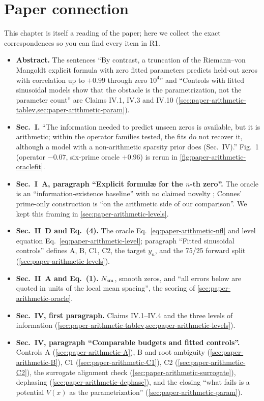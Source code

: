 \section{Paper connection}\label{sec:paper-arithmetic-paper}

This chapter is itself a reading of the paper; here we collect the exact correspondences so you can find every item in R1.

\begin{itemize}
\item \textbf{Abstract.} The sentences ``By contrast, a truncation of the Riemann--von Mangoldt explicit formula with zero fitted parameters predicts held-out zeros with correlation up to $+0.99$ through zero $10^4$'' and ``Controls with fitted sinusoidal models show that the obstacle is the parametrization, not the parameter count'' are Claims IV.1, IV.3 and IV.10 (\cref{sec:paper-arithmetic-tablev,sec:paper-arithmetic-param}).
\item \textbf{Sec.~I.} ``The information needed to predict unseen zeros is available, but it is arithmetic; within the operator families tested, the fits do not recover it, although a model with a non-arithmetic sparsity prior does (Sec.~IV).'' Fig.~1 (operator $-0.07$, six-prime oracle $+0.96$) is rerun in \cref{fig:paper-arithmetic-oraclefit}.
\item \textbf{Sec.~I~A, paragraph ``Explicit formul\ae{} for the $n$-th zero''.} The oracle is an ``information-existence baseline'' with no claimed novelty \cite{francaleclair,leclair}; Connes' prime-only construction \cite{connes26} is ``on the arithmetic side of our comparison''. We kept this framing in \cref{sec:paper-arithmetic-levels}.
\item \textbf{Sec.~II~D and Eq.~(4).} The oracle Eq.~\eqref{eq:paper-arithmetic-nfl} and level equation Eq.~\eqref{eq:paper-arithmetic-level}; paragraph ``Fitted sinusoidal controls'' defines A, B, C1, C2, the target $y_n$, and the 75/25 forward split (\cref{sec:paper-arithmetic-levels}).
\item \textbf{Sec.~II~A and Eq.~(1).} $N_{\mathrm{sm}}$, smooth zeros, and ``all errors below are quoted in units of the local mean spacing'', the scoring of \cref{sec:paper-arithmetic-oracle}.
\item \textbf{Sec.~IV, first paragraph.} Claims IV.1--IV.4 and the three levels of information (\cref{sec:paper-arithmetic-tablev,sec:paper-arithmetic-levels}).
\item \textbf{Sec.~IV, paragraph ``Comparable budgets and fitted controls''.} Controls A (\cref{sec:paper-arithmetic-A}), B and root ambiguity (\cref{sec:paper-arithmetic-B}), C1 (\cref{sec:paper-arithmetic-C1}), C2 (\cref{sec:paper-arithmetic-C2}), the surrogate alignment check (\cref{sec:paper-arithmetic-surrogate}), dephasing (\cref{sec:paper-arithmetic-dephase}), and the closing ``what fails is a potential $V(x)$ as the parametrization'' (\cref{sec:paper-arithmetic-param}).

\end{itemize}
